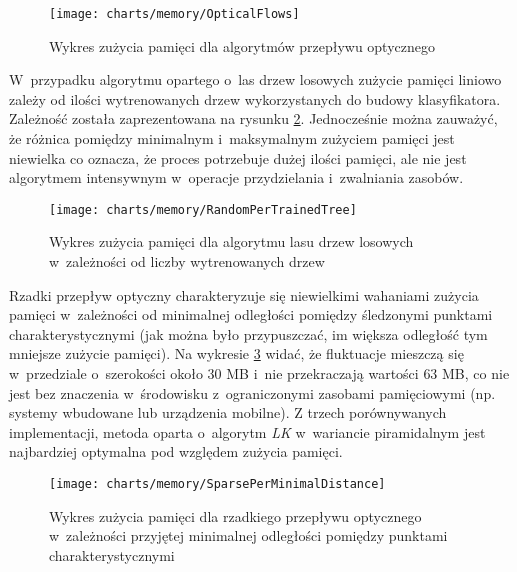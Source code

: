     \begin{figure}[!ht]
      \centering
      \texttt{[image: charts/memory/OpticalFlows]}
      \caption[Wykres zużycia pamięci dla algorytmów przepływu optycznego]
              {Wykres zużycia pamięci dla algorytmów przepływu optycznego}
      \label{fig:OpticalFlowsMemoryUsage}
    \end{figure}

    W~przypadku algorytmu opartego o~las drzew losowych zużycie pamięci liniowo zależy od ilości wytrenowanych drzew wykorzystanych do budowy klasyfikatora. Zależność została zaprezentowana na rysunku \ref{fig:RandomForestTrackerPerTrainedTreesAmount}. Jednocześnie można zauważyć, że różnica pomiędzy minimalnym i~maksymalnym zużyciem pamięci jest niewielka co oznacza, że proces potrzebuje dużej ilości pamięci, ale nie jest algorytmem intensywnym w~operacje przydzielania i~zwalniania zasobów.

    \begin{figure}[!ht]
      \centering
      \texttt{[image: charts/memory/RandomPerTrainedTree]}
      \caption[Wykres zużycia pamięci dla algorytmu lasu drzew losowych w~zależności od liczby wytrenowanych drzew]
              {Wykres zużycia pamięci dla algorytmu lasu drzew losowych w~zależności od liczby wytrenowanych drzew}
      \label{fig:RandomForestTrackerPerTrainedTreesAmount}
    \end{figure}

    Rzadki przepływ optyczny charakteryzuje się niewielkimi wahaniami zużycia pamięci w~zależności od minimalnej odległości pomiędzy śledzonymi punktami charakterystycznymi (jak można było przypuszczać, im większa odległość tym mniejsze zużycie pamięci). Na wykresie \ref{fig:SparseOpticalFlowPerMinimalDistanceBetweenPoints} widać, że fluktuacje mieszczą się w~przedziale o~szerokości około $30$ MB i~nie przekraczają wartości $63$ MB, co nie jest bez znaczenia w~środowisku z~ograniczonymi zasobami pamięciowymi (np. systemy wbudowane lub urządzenia mobilne). Z trzech porównywanych implementacji, metoda oparta o~algorytm \textit{LK} w~wariancie piramidalnym jest najbardziej optymalna pod względem zużycia pamięci.

    \begin{figure}[!ht]
      \centering
      \texttt{[image: charts/memory/SparsePerMinimalDistance]}
      \caption[Wykres zużycia pamięci dla rzadkiego przepływu optycznego w~zależności przyjętej minimalnej odległości pomiędzy punktami charakterystycznymi]
              {Wykres zużycia pamięci dla rzadkiego przepływu optycznego w~zależności przyjętej minimalnej odległości pomiędzy punktami charakterystycznymi}
      \label{fig:SparseOpticalFlowPerMinimalDistanceBetweenPoints}
    \end{figure}

